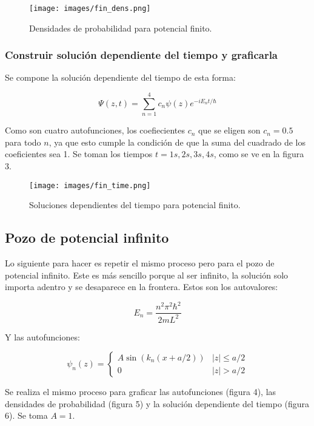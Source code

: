 \documentclass{article}
\begin{document}
\begin{figure}
    \texttt{[image: images/fin\_dens.png]}
    \centering
    \caption{Densidades de probabilidad para potencial finito.}
\end{figure}

\subsubsection{Construir solución dependiente del tiempo y graficarla}

Se compone la solución dependiente del tiempo de esta forma:

\begin{equation}
    \Psi(z,t)=\sum_{n=1}^4c_n\psi(z)e^{-iE_nt/\hbar}
\end{equation}

Como son cuatro autofunciones, los coefiecientes $c_n$ que se eligen son $c_n=0.5$ para todo $n$, ya que esto cumple la condición de que la suma del cuadrado de los coeficientes sea 1. Se toman los tiempos $t=1s,2s,3s,4s$, como se ve en la figura 3.

\begin{figure}
    \texttt{[image: images/fin\_time.png]}
    \centering
    \caption{Soluciones dependientes del tiempo para potencial finito.}
\end{figure}

\subsection{Pozo de potencial infinito}

Lo siguiente para hacer es repetir el mismo proceso pero para el pozo de potencial infinito. Este es más sencillo porque al ser infinito, la solución solo importa adentro y se desaparece en la frontera. Estos son los autovalores:

\begin{equation}
    E_n=\frac{n^2\pi^2\hbar^2}{2mL^2}
\end{equation}

Y las autofunciones:

\begin{equation}
    \psi_n(z)=
    \begin{cases}
       A\sin(k_n(x+a/2)) &|z|\leq a/2 \\
       0 &|z|> a/2
    \end{cases}
\end{equation}


Se realiza el mismo proceso para graficar las autofunciones (figura 4), las densidades de probabilidad (figura 5) y la solución dependiente del tiempo (figura 6). Se toma $A=1$.
\end{document}

